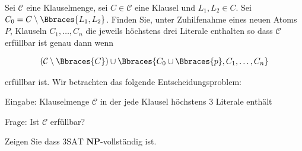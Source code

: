 
\begin{exercise}

Sei $\mathcal C$ eine Klauselmenge, sei $C \in \mathcal C$ eine Klausel und $L_1, L_2 \in C$.
Sei $C_0 = C \setminus \Bbraces{L_1, L_2}$.
Finden Sie, unter Zuhilfenahme eines neuen Atoms $P$, Klauseln $C_1, \dots, C_n$ die jeweils höchstens drei Literale enthalten so dass $\mathcal C$ erfüllbar ist genau dann wenn

\begin{align*}
    (\mathcal C \setminus \Bbraces{C})
    \cup
    \Bbraces{C_0 \cup \Bbraces{p}, C_1, \dots, C_n}
\end{align*}

erfüllbar ist.
Wir betrachten das folgende Entscheidungsproblem:

\begin{center}
    \begin{hetzlbox}[title = 3SAT]
        
        Eingabe:
        Klauselmenge $\mathcal C$ in der jede Klausel höchstens $3$ Literale enthält
    
        Frage:
        Ist $\mathcal C$ erfüllbar?
    
    \end{hetzlbox}    
\end{center}

Zeigen Sie dass $\mathrm{3SAT}$ $\mathbf{NP}$-vollständig ist.

\end{exercise}


